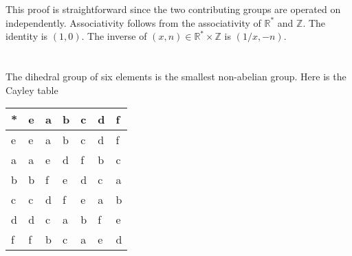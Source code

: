 \documentclass[a4paper]{article}
\begin{document}
This proof is straightforward since the two contributing groups are operated on independently. Associativity follows from the associativity of $\mathbb{R}^*$ and $\mathbb{Z}$. The identity is $(1,0)$. The inverse of $(x, n) \in \mathbb{R}^* \times \mathbb{Z}$ is $(1/x, -n)$.

\section{}

The dihedral group of six elements is the smallest non-abelian group. Here is the Cayley table

\begin{tabular}{ l | l l l l l l }
  * & e & a & b & c & d & f \\
  \hline      
  e & e & a & b & c & d & f \\
  a & a & e & d & f & b & c \\
  b & b & f & e & d & c & a \\
  c & c & d & f & e & a & b \\
  d & d & c & a & b & f & e \\
  f & f & b & c & a & e & d
\end{tabular}

\section{}


\section{}


\section{}


\section{}


\section{}


\section{}


\section{}
\end{document}

